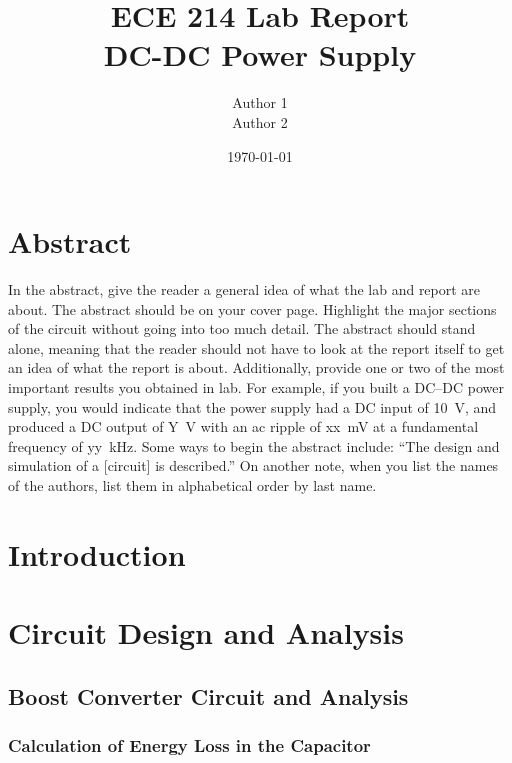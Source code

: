 \documentclass[11pt]{article}
\begin{document}
\title{ \textbf{ECE 214 Lab Report}\\
	DC-DC Power Supply}
\author{Author 1\\
  	Author 2}
\date{\today}
\maketitle
\thispagestyle{empty}

\section*{Abstract}
\noindent In the abstract, give the reader a general idea of what the lab and report are about. The abstract should be on your cover page. Highlight the major sections of the circuit without going into too much detail. The abstract should stand alone, meaning that the reader should not have to look at the report itself to get an idea of what the report is about. Additionally, provide one or two of the most important results you obtained in lab. For example, if you built a DC--DC power supply, you would indicate that the power supply had a DC input of 10~V, and produced a DC output of Y~V with an ac ripple of xx~mV at a fundamental frequency of yy~kHz. Some ways to begin the abstract include:
``The design and simulation of a [circuit] is described.''
On another note, when you list the names of the authors, list them in alphabetical order by last name.


\newpage
\tableofcontents

\newpage
\listoffigures

\newpage
\listoftables

\newpage 
{} %

\section{Introduction}

\section{Circuit Design and Analysis}

\subsection{Boost Converter Circuit and Analysis}

\subsubsection{Calculation of Energy Loss in the Capacitor}
\end{document}
